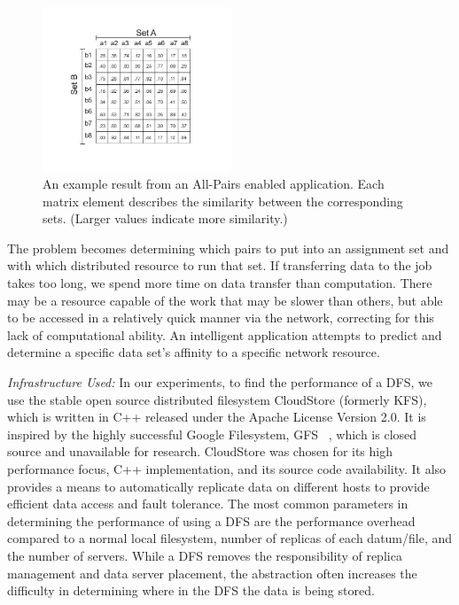 \documentclass{rspublic}
\newcommand{\micnote}[1]{ {\textcolor{blue} { ***Michael: #1 }}}
\newcommand{\betynote}[1]{ {\textcolor{orange} { ***Bety: #1 }}}
\newcommand{\jhanote}[1]{} \newcommand{\micnote}[1]{}\newcommand{\betynote}[1]{} \newcommand{\fixme}[1]{}
\begin{document}
\begin{figure}[!ht]
 \begin{center}
     \includegraphics[width=0.50\textwidth]{data/allpairs-exp.pdf}
\end{center}
\caption{\small An example result from an All-Pairs enabled application.
Each matrix element describes the similarity between the corresponding
sets. (Larger values indicate more similarity.)}
 \label{Fig:AllPairsExplanation}
\end{figure}

The problem becomes determining which pairs to put into an assignment
set and with which distributed resource to run that set.  If
transferring data to the job takes too long, we spend more time on
data transfer than computation. There may be a resource capable of the
work that may be slower than others, but able to be accessed in a
relatively quick manner via the network, correcting for this lack of
computational ability. An intelligent application attempts to predict
and determine a specific data set's affinity to a specific network
resource.


{\it Infrastructure Used: } In our experiments, to find the performance
of a DFS, we use the stable open
source distributed filesystem CloudStore (formerly KFS), which is
written in C++ released under the Apache License Version 2.0. It is
inspired by the highly successful Google Filesystem, GFS
~\citep{cloudstore_web}, which is closed source and unavailable for
research. CloudStore was chosen for its high performance focus, C++
implementation, and its source code availability. It also provides a
means to automatically replicate data on different hosts to provide
efficient data access and fault tolerance. \jhanote{Place somewhere
  proper?} The most common parameters in determining the performance
of using a DFS are the performance overhead compared to a normal local
filesystem, number of replicas of each datum/file, and the number of
servers.  While a DFS removes the responsibility of replica management
and data server placement, the abstraction often increases the
difficulty in determining where in the DFS the data is being stored.
\end{document}
